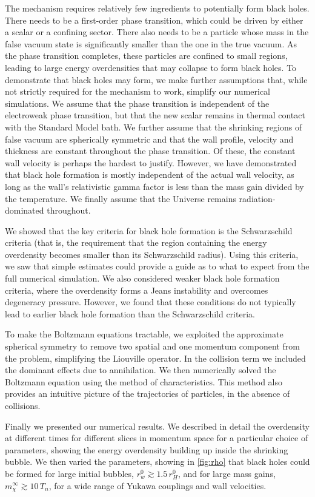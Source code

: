 \documentclass[
onecolumn, %
11pt, %
tightenlines,
superscriptaddress, %
nofootinbib, %
preprintnumbers, %
prd %
]{revtex4-1}
\begin{document}
The mechanism requires relatively few ingredients to potentially form black holes.  There needs to be a first-order phase transition, which could be driven by either a scalar or a confining sector.  There also needs to be a particle whose mass in the false vacuum state is significantly smaller than the one in the true vacuum.  As the phase transition completes, these particles are confined to small regions, leading to large energy overdensities that may collapse to form black holes.  To demonstrate that black holes may form, we make further assumptions that, while not strictly required for the mechanism to work, simplify our numerical simulations.  We assume that the phase transition is independent of the electroweak phase transition, but that the new scalar remains in thermal contact with the Standard Model bath.  We further assume that the shrinking regions of false vacuum are spherically symmetric and that the wall profile, velocity and thickness are constant throughout the phase transition.  Of these, the constant wall velocity is perhaps the hardest to justify.  However, we have demonstrated that black hole formation is mostly independent of the actual wall velocity, as long as the wall's relativistic gamma factor is less than the mass gain divided by the temperature.  We finally assume that the Universe remains radiation-dominated throughout.

We showed that the key criteria for black hole formation is the Schwarzschild criteria (that is, the requirement that the region containing the energy overdensity becomes smaller than its Schwarzschild radius).  Using this criteria, we saw that simple estimates could provide a guide as to what to expect from the full numerical simulation.  We also considered weaker black hole formation criteria, where the overdensity forms a Jeans instability and overcomes degeneracy pressure.  However, we found that these conditions do not typically lead to earlier black hole formation than the Schwarzschild criteria.

To make the Boltzmann equations tractable, we exploited the approximate spherical symmetry to remove two spatial and one momentum component from the problem, simplifying the Liouville operator.  In the collision term we included the dominant effects due to annihilation.  We then numerically solved the Boltzmann equation using the method of characteristics.  This method also provides an intuitive picture of the trajectories of particles, in the absence of collisions.

Finally we presented our numerical results.  We described in detail the overdensity at different times for different slices in momentum space for a particular choice of parameters, showing the energy overdensity building up inside the shrinking bubble.   We then varied the parameters, showing in \cref{fig:rho} that black holes could be formed for large initial bubbles, $r_w^0 \gtrsim 1.5\,r_H^0$, and for large mass gains, $m_\chi^\infty \gtrsim 10\,T_n$, for a wide range of Yukawa couplings and wall velocities.
\end{document}
